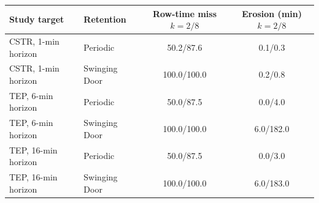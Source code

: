\begin{tabular}{@{}llcc@{}}
\toprule
Study target & Retention & \shortstack{Row-time miss\\$k=2/8$} & \shortstack{Erosion (min)\\$k=2/8$} \\
\midrule
CSTR, 1-min horizon & Periodic & 50.2/87.6 & 0.1/0.3 \\
CSTR, 1-min horizon & Swinging Door & 100.0/100.0 & 0.2/0.8 \\
TEP, 6-min horizon & Periodic & 50.0/87.5 & 0.0/4.0 \\
TEP, 6-min horizon & Swinging Door & 100.0/100.0 & 6.0/182.0 \\
TEP, 16-min horizon & Periodic & 50.0/87.5 & 0.0/3.0 \\
TEP, 16-min horizon & Swinging Door & 100.0/100.0 & 6.0/183.0 \\
\bottomrule
\end{tabular}
